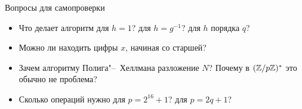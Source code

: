 \documentclass{ca-slides}
\begin{document}
\begin{canvasframe}{Вопросы для самопроверки}
  \begin{itemize}
    \item Что делает алгоритм для $h = 1$? для $h = g^{-1}$? для $h$ порядка $q$?
    \item Можно ли находить цифры $x$, начиная со старшей?
    \item Зачем алгоритму Полига"--~Хеллмана разложение $N$? Почему в $(\mathbb{Z}/p\mathbb{Z})^{*}$ это обычно не
      проблема?
    \item Сколько операций нужно для $p = 2^{16} + 1$? для $p = 2q + 1$?
  \end{itemize}
  \penspace
\end{canvasframe}
\end{document}
